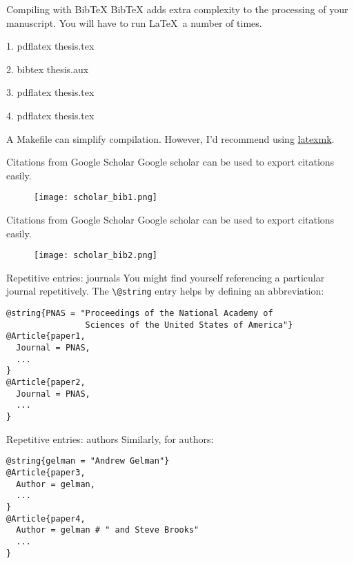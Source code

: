 \begin{frame}{Compiling with BibTeX}
  BibTeX adds extra complexity to the processing of your manuscript. You will
  have to run \LaTeX\ a number of times.

  \alert{1.} pdflatex thesis.tex

  \alert{2.} bibtex thesis.\alert{aux}

  \alert{3.} pdflatex thesis.tex

  \alert{4.} pdflatex thesis.tex

  A Makefile can simplify compilation. However, I'd recommend using
  \href{https://ctan.org/pkg/latexmk?lang=en}{latexmk}.
\end{frame}

\begin{frame}{Citations from Google Scholar}
  Google scholar can be used to export citations easily.
  \begin{figure}
    \centering
    \texttt{[image: scholar\_bib1.png]}
  \end{figure}
\end{frame}

\begin{frame}{Citations from Google Scholar}
  Google scholar can be used to export citations easily.
  \begin{figure}
    \centering
    \texttt{[image: scholar\_bib2.png]}
  \end{figure}
\end{frame}

\begin{frame}[fragile]{Repetitive entries: journals}
  You might find yourself referencing a particular journal repetitively.
  The \lstinline|\@string| entry helps by defining an abbreviation:
  \begin{lstlisting}
@string{PNAS = "Proceedings of the National Academy of
                Sciences of the United States of America"}
@Article{paper1,
  Journal = PNAS, 
  ...
}
@Article{paper2,
  Journal = PNAS, 
  ...
}
  \end{lstlisting}
\end{frame}

\begin{frame}[fragile]{Repetitive entries: authors}
  Similarly, for authors:
  \begin{lstlisting}
@string{gelman = "Andrew Gelman"}
@Article{paper3,
  Author = gelman, 
  ...
}
@Article{paper4,
  Author = gelman # " and Steve Brooks"
  ...
}
  \end{lstlisting}
\end{frame}
